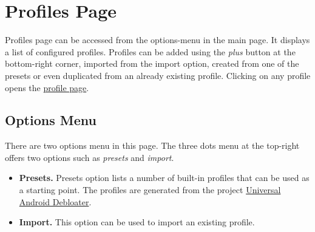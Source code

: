 \section{Profiles Page}\label{sec:profiles-page}
Profiles page can be accessed from the options-menu in the main page. It displays a list of configured profiles.
Profiles can be added using the \textit{plus} button at the bottom-right corner, imported from the import option,
created from one of the presets or even duplicated from an already existing profile. Clicking on any profile opens the
\hyperref[sec:profile-page]{profile page}.

\subsection{Options Menu}\label{subsec:profiles-options-menu}
There are two options menu in this page. The three dots menu at the top-right offers two options such as
\textit{presets} and \textit{import}.
\begin{itemize}
    \item \textbf{Presets.} Presets option lists a number of built-in profiles that can be used as a starting point.
    The profiles are generated from the project \href{https://gitlab.com/W1nst0n/universal-android-debloater}{Universal
    Android Debloater}.\\

    \item \textbf{Import.} This option can be used to import an existing profile.
\end{itemize}

